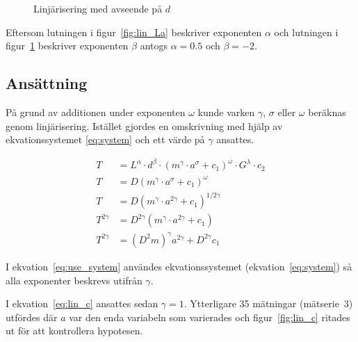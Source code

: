\documentclass[a4paper,12pt]{article}
\begin{document}
\begin{figure}
  \caption{Linjärisering med avseende på $d$}
  \label{fig:lin_db}
\end{figure}

Eftersom lutningen i figur~\ref{fig:lin_La} beskriver exponenten $\alpha$ och
lutningen i figur~\ref{fig:lin_db} beskriver exponenten $\beta$ antogs $\alpha =
0.5$ och $\beta = -2$.

\subsection{Ansättning}

På grund av additionen under exponenten $\omega$ kunde varken $\gamma$, $\sigma$
eller $\omega$ beräknas genom linjärisering. Istället gjordes en omskrivning med
hjälp av ekvationssystemet \eqref{eq:system} och ett värde på $\gamma$ ansattes.

\begin{align}
  T &= L^\alpha \cdot d^\beta \cdot (m^\gamma \cdot a^\sigma + c_1)^\omega \cdot G^\lambda  \cdot c_2\nonumber \\
  T &= D (m^\gamma \cdot a^\sigma + c_1)^\omega \nonumber \\
  T &= D (m^\gamma \cdot a^{2\gamma} + c_1)^{1/2\gamma} \label{eq:use_system} \\
  T^{2\gamma} &= D^{2\gamma} (m^\gamma \cdot a^{2\gamma} + c_1) \nonumber \\
  T^{2\gamma} &= (D^2m)^\gamma a^{2\gamma} + D^{2\gamma}c_1 \label{eq:lin_c}
\end{align}

I ekvation~\eqref{eq:use_system} användes ekvationssystemet
(ekvation~\eqref{eq:system}) så alla exponenter beskrevs utifrån $\gamma$.

I ekvation~\eqref{eq:lin_c} ansattes sedan $\gamma = 1$. Ytterligare 35 mätningar (mätserie~3)
utfördes där $a$ var den enda variabeln som varierades och figur~\ref{fig:lin_c}
ritades ut för att kontrollera hypotesen.
\end{document}
